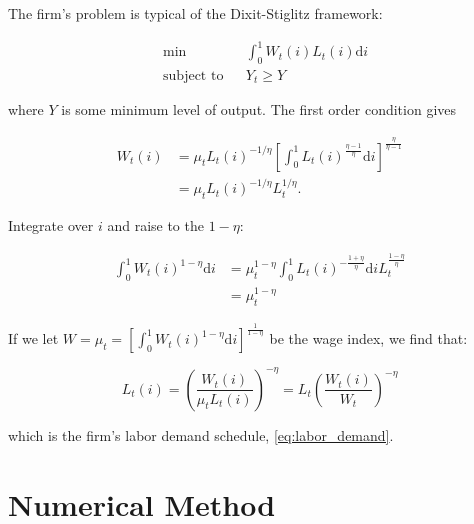 \documentclass[12pt,a4paper]{scrartcl}            %
\begin{document}
The firm's problem is typical of the Dixit-Stiglitz framework:

\begin{equation}
    \label{eqa:firms_problem}
    \begin{aligned}
        & \min
        & & \int_{0}^{1} \! W_t(i)L_t(i) \mathrm{d}i \\
        & \text{subject to}
        & & Y_t \geq Y
    \end{aligned}
\end{equation}

where $Y$ is some minimum level of output.  The first order condition gives

\begin{equation}
    \label{eqa:firms_foc}
    \begin{aligned}
        W_t(i) &= \mu_t L_t(i)^{-1 / \eta} \left[ \int_{0}^{1} \! L_t(i)^{\frac{\eta - 1}{\eta}} \mathrm{d}i \right]^{\frac{\eta}{\eta - 1}}\\
               &= \mu_t L_t(i)^{-1 / \eta} L_t^{1 / \eta}.
    \end{aligned}
\end{equation}

Integrate over $i$ and raise to the $1 - \eta$:

\begin{equation}
    \label{eqa:firms_foc2}
    \begin{aligned}
        \int_{0}^{1} \! W_t(i)^{1 - \eta} \mathrm{d}i &= \mu_t^{1 - \eta} \int_{0}^{1} \! L_t(i)^{-\frac{1 + \eta}{\eta}} \mathrm{d}i L_t^{\frac{1 - \eta}{\eta}}\\
                                                      &= \mu_t^{1 - \eta}
    \end{aligned}
\end{equation}

If we let $W = \mu_t = \left[ \int_{0}^{1} \! W_t(i)^{1 - \eta} \mathrm{d}i \right]^{\frac{1}{1 - \eta}}$ be the wage index, we find that:

\begin{equation}
    \label{eqa:firms_foc3}
    L_t(i) = \left(\frac{W_t(i)}{\mu_t L_t(i)}\right)^{-\eta} = L_t \left( \frac{W_t(i)}{W_t} \right)^{-\eta}
\end{equation}

which is the firm's labor demand schedule, \eqref{eq:labor_demand}.
\section{Numerical Method}
\label{sec:numerical_method}
\end{document}
